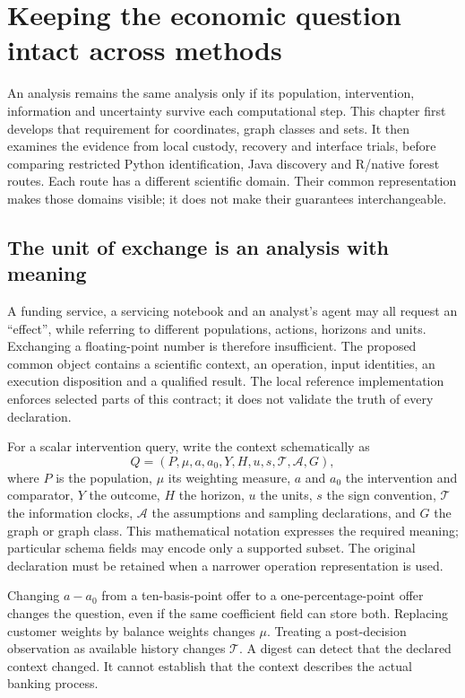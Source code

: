 \chapter{Keeping the economic question intact across methods}
\label{in:semantics}

An analysis remains the same analysis only if its population, intervention, information and uncertainty survive each computational step. This chapter first develops that requirement for coordinates, graph classes and sets. It then examines the evidence from local custody, recovery and interface trials, before comparing restricted Python identification, Java discovery and R/native forest routes. Each route has a different scientific domain. Their common representation makes those domains visible; it does not make their guarantees interchangeable.

\section{The unit of exchange is an analysis with meaning}

A funding service, a servicing notebook and an analyst's agent may all request
an ``effect'', while referring to different populations, actions, horizons and
units. Exchanging a floating-point number is therefore insufficient. The
proposed common object contains a scientific context, an operation, input
identities, an execution disposition and a qualified result. The local
reference implementation enforces selected parts of this contract; it does not
validate the truth of every declaration. \cite{v12_in_contract,v12_in_runtime}

For a scalar intervention query, write the context schematically as
\[
 Q=(P,\mu,a,a_0,Y,H,u,s,\mathcal T,\mathcal A,G),
\]
where $P$ is the population, $\mu$ its weighting measure, $a$ and $a_0$ the
intervention and comparator, $Y$ the outcome, $H$ the horizon, $u$ the units,
$s$ the sign convention, $\mathcal T$ the information clocks, $\mathcal A$ the
assumptions and sampling declarations, and $G$ the graph or graph class.
This mathematical notation expresses the required meaning; particular schema
fields may encode only a supported subset. The original declaration must be
retained when a narrower operation representation is used.

Changing $a-a_0$ from a ten-basis-point offer to a one-percentage-point offer
changes the question, even if the same coefficient field can store both.
Replacing customer weights by balance weights changes $\mu$. Treating a
post-decision observation as available history changes $\mathcal T$. A digest
can detect that the declared context changed. It cannot establish that the
context describes the actual banking process.

